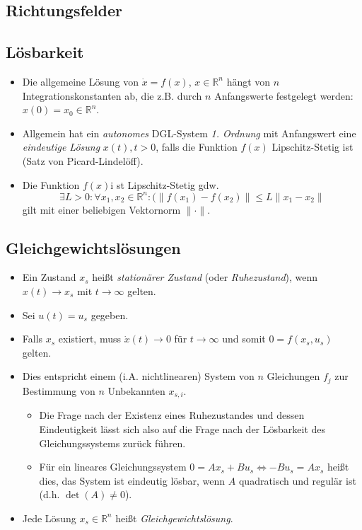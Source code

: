 		\subsection{Richtungsfelder} %

		\subsection{Lösbarkeit} %
			\begin{itemize}
				\item Die allgemeine Lösung von \( \dot{x} = f(x) \), \( x \in \mathbb{R} ^ n \) hängt von \( n \) Integrationskonstanten ab, die z.B. durch \( n \) Anfangswerte festgelegt werden: \( x(0) = x _ 0 \in \mathbb{R} ^ n \).
				\item Allgemein hat ein \textit{autonomes} DGL-System \textit{1. Ordnung} mit Anfangswert eine \textit{eindeutige Lösung} \( x(t), t > 0 \), falls die Funktion \( f(x) \) Lipschitz-Stetig ist (Satz von Picard-Lindelöff).
				\item Die Funktion \( f(x) \)i st Lipschitz-Stetig gdw. \[ \exists L > 0 : \forall x _ 1, x _ 2 \in \mathbb{R} ^ n : (\lVert f(x _ 1) - f(x _ 2) \rVert \leq L \lVert x _ 1 - x _ 2 \rVert \] gilt mit einer beliebigen Vektornorm \( \lVert \cdot \rVert \).
			\end{itemize}

		\subsection{Gleichgewichtslösungen} %
			\begin{itemize}
				\item Ein Zustand \( x _ s \) heißt \textit{stationärer Zustand} (oder \textit{Ruhezustand}), wenn \( x(t) \rightarrow x _ s \) mit \( t \rightarrow \infty \) gelten.
				\item Sei \( u(t) = u _ s \) gegeben.
				\item Falls \( x _ s \) existiert, muss \( \dot{x}(t) \rightarrow 0 \) für \( t \rightarrow \infty \) und somit \( 0 = f(x _ s, u _ s) \) gelten.
				\item Dies entspricht einem (i.A. nichtlinearen) System von \(n\) Gleichungen \(f_j\) zur Bestimmung von \(n\) Unbekannten \(x_{s,i}\).
					\begin{itemize}
						\item Die Frage nach der Existenz eines Ruhezustandes und dessen Eindeutigkeit lässt sich also auf die Frage nach der Lösbarkeit des Gleichungssystems zurück führen.
						\item Für ein lineares Gleichungssystem \( 0 = Ax_s + Bu_s \iff -Bu_s = Ax_s \) heißt dies, das System ist eindeutig lösbar, wenn \(A\) quadratisch und regulär ist (d.h. \( \det(A) \neq 0 \)).
					\end{itemize}
				\item Jede Lösung \( x _ s \in \mathbb{R} ^ n \) heißt \textit{Gleichgewichtslösung}.
			\end{itemize}

